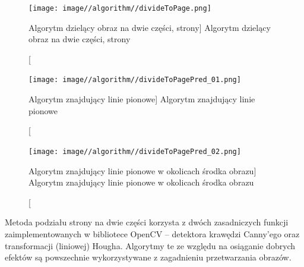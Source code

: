 \documentclass[a4paper,12pt]{article}
\begin{document}
    	        \begin{figure}[!ht]  
    			    \begin{center}
    				  \texttt{[image: image//algorithm//divideToPage.png]} 
    			    \end{center}
    			    \caption
        			    [Algorytm dzielący obraz na dwie części, strony]
        			    {Algorytm dzielący obraz na dwie części, strony}  
        			    \label{fig:imgToTwo}
    		    \end{figure}
    		
    		\newpage
    		
    	        \begin{figure}[!ht]  
    			    \begin{center}
    				    \texttt{[image: image//algorithm//divideToPagePred\_01.png]} 
    			    \end{center}
    			    \caption
        			    [Algorytm znajdujący linie pionowe]  
        			    {Algorytm znajdujący linie pionowe}  
    		    \end{figure}
		
    	        \begin{figure}[!ht]  
    			    \begin{center}
    				    \texttt{[image: image//algorithm//divideToPagePred\_02.png]} 
    			    \end{center}
    			    \caption
        			[Algorytm znajdujący linie pionowe w okolicach środka obrazu]  
        			{Algorytm znajdujący linie pionowe w okolicach środka obrazu}  
    		    \end{figure}
		
		        \newpage
		
		        Metoda podziału strony na dwie części korzysta z dwóch zasadniczych funkcji zaimplementowanych w bibliotece OpenCV -- detektora krawędzi Canny'ego oraz transformacji (liniowej) Hougha. Algorytmy te ze względu na osiąganie dobrych efektów są powszechnie wykorzystywane z zagadnieniu przetwarzania obrazów.
		
		
\end{document}
